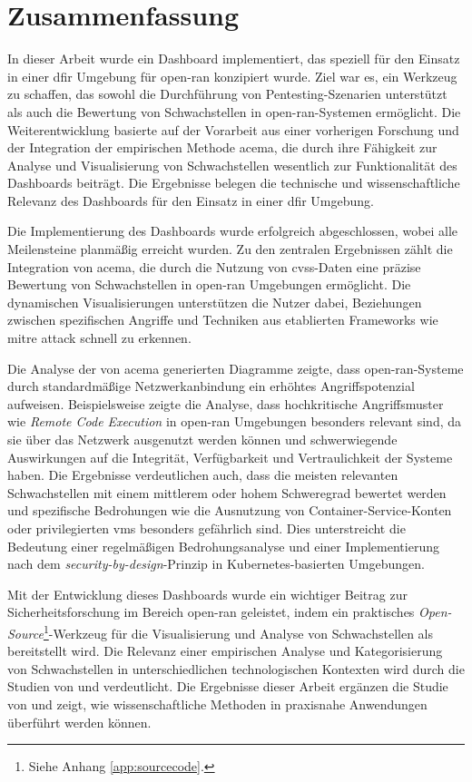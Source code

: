 \chapter{Zusammenfassung}
\label{chap:zusammenfassung}
In dieser Arbeit wurde ein Dashboard implementiert, das speziell für den Einsatz in einer \gls{dfir} Umgebung für \gls{open-ran} konzipiert wurde. Ziel war es, ein Werkzeug zu schaffen, das sowohl die Durchführung von Pentesting-Szenarien unterstützt als auch die Bewertung von Schwachstellen in \gls{open-ran}-Systemen ermöglicht. Die Weiterentwicklung basierte auf der Vorarbeit aus einer vorherigen Forschung und der Integration der empirischen Methode \gls{acema}, die durch ihre Fähigkeit zur Analyse und Visualisierung von Schwachstellen wesentlich zur Funktionalität des Dashboards beiträgt. Die Ergebnisse belegen die technische und wissenschaftliche Relevanz des Dashboards für den Einsatz in einer \gls{dfir} Umgebung.

Die Implementierung des Dashboards wurde erfolgreich abgeschlossen, wobei alle Meilensteine planmäßig erreicht wurden. Zu den zentralen Ergebnissen zählt die Integration von \gls{acema}, die durch die Nutzung von \gls{cvss}-Daten eine präzise Bewertung von Schwachstellen in \gls{open-ran} Umgebungen ermöglicht. Die dynamischen Visualisierungen unterstützen die Nutzer dabei, Beziehungen zwischen spezifischen Angriffe und Techniken aus etablierten Frameworks wie \gls{mitre} \gls{attack} schnell zu erkennen.

Die Analyse der von \gls{acema} generierten Diagramme zeigte, dass \gls{open-ran}-Systeme durch standardmäßige Netzwerkanbindung ein erhöhtes Angriffspotenzial aufweisen. Beispielsweise zeigte die Analyse, dass hochkritische Angriffsmuster wie \textit{Remote Code Execution} in \gls{open-ran} Umgebungen besonders relevant sind, da sie über das Netzwerk ausgenutzt werden können und schwerwiegende Auswirkungen auf die Integrität, Verfügbarkeit und Vertraulichkeit der Systeme haben. Die Ergebnisse verdeutlichen auch, dass die meisten relevanten Schwachstellen mit einem mittlerem oder hohem Schweregrad bewertet werden und spezifische Bedrohungen wie die Ausnutzung von Container-Service-Konten oder privilegierten \glspl{vm} besonders gefährlich sind. Dies unterstreicht die Bedeutung einer regelmäßigen Bedrohungsanalyse und einer Implementierung nach dem \textit{security-by-design}-Prinzip in Kubernetes-basierten Umgebungen.

Mit der Entwicklung dieses Dashboards wurde ein wichtiger Beitrag zur Sicherheitsforschung im Bereich \gls{open-ran} geleistet, indem ein praktisches \textit{Open-Source}\footnote{Siehe Anhang \ref{app:sourcecode}.}-Werkzeug für die Visualisierung und Analyse von Schwachstellen als bereitstellt wird. Die Relevanz einer empirischen Analyse und Kategorisierung von Schwachstellen in unterschiedlichen technologischen Kontexten wird durch die Studien von \autocite{mazuera-rozoAndroidOSStack2019} und \autocite{klementSecuring6GTransition2024} verdeutlicht. Die Ergebnisse dieser Arbeit ergänzen die Studie von \citeauthor{klementSecuring6GTransition2024} und zeigt, wie wissenschaftliche Methoden in praxisnahe Anwendungen überführt werden können.

